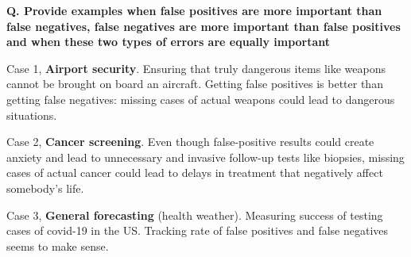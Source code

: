 \begin{frame}[fragile]{\textbf{Q. Provide examples when false positives are more
      important than false negatives, false negatives are more important than
      false positives and when these two types of errors are equally important}}
  \begin{wideitemize}
    \item Case 1, \textbf{Airport security}. Ensuring that truly dangerous items like
    weapons cannot be brought on board an aircraft. Getting false positives is better than
    getting false negatives: missing cases of actual weapons could lead to dangerous situations.
  \item Case 2, \textbf{Cancer screening}. Even though false-positive results could create
  anxiety and lead to unnecessary and invasive follow-up tests like biopsies, missing cases of
  actual cancer could lead to delays in treatment that negatively affect somebody's life.
  \item Case 3, \textbf{General forecasting} (health weather). Measuring success of testing cases
  of covid-19 in the US. Tracking rate of false positives and false negatives seems to make sense.
  \end{wideitemize}
\end{frame}


